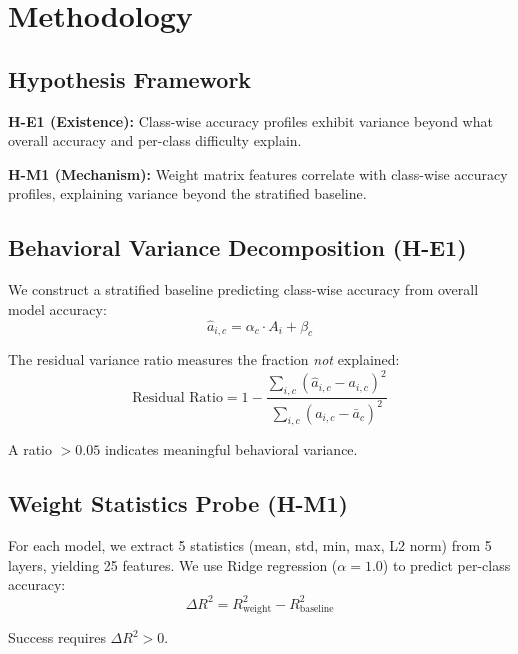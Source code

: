 \section{Methodology}

\subsection{Hypothesis Framework}

\textbf{H-E1 (Existence):} Class-wise accuracy profiles exhibit variance beyond what overall accuracy and per-class difficulty explain.

\textbf{H-M1 (Mechanism):} Weight matrix features correlate with class-wise accuracy profiles, explaining variance beyond the stratified baseline.

\subsection{Behavioral Variance Decomposition (H-E1)}

We construct a stratified baseline predicting class-wise accuracy from overall model accuracy:
\begin{equation}
\hat{a}_{i,c} = \alpha_c \cdot A_i + \beta_c
\end{equation}

The residual variance ratio measures the fraction \emph{not} explained:
\begin{equation}
\text{Residual Ratio} = 1 - \frac{\sum_{i,c}(\hat{a}_{i,c} - a_{i,c})^2}{\sum_{i,c}(a_{i,c} - \bar{a}_c)^2}
\end{equation}

A ratio $> 0.05$ indicates meaningful behavioral variance.

\subsection{Weight Statistics Probe (H-M1)}

For each model, we extract 5 statistics (mean, std, min, max, L2 norm) from 5 layers, yielding 25 features. We use Ridge regression ($\alpha = 1.0$) to predict per-class accuracy:
\begin{equation}
\Delta R^2 = R^2_{\text{weight}} - R^2_{\text{baseline}}
\end{equation}

Success requires $\Delta R^2 > 0$.
